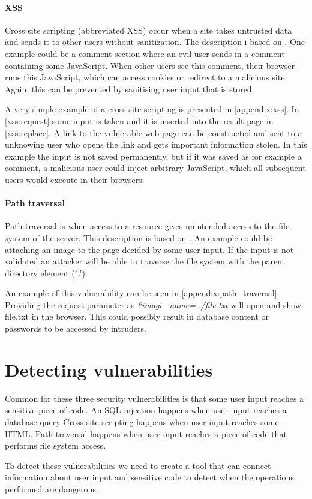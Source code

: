 \paragraph{XSS}
Cross site scripting (abbreviated XSS) occur when a site takes untrusted data and sends it to other users without sanitization.
The description i based on \citet{crosssitescripting}.
One example could be a comment section where an evil user sends in a comment containing some JavaScript.
When other users see this comment, their browser runs this JavaScript, which can access cookies or redirect to a malicious site.
Again, this can be prevented by sanitising user input that is stored.

A very simple example of a cross site scripting is presented in \cref{appendix:xss}.
In \cref{xss:request} some input is taken and it is inserted into the result page in \cref{xss:replace}.
A link to the vulnerable web page can be constructed and sent to a unknowing user who opens the link and gets important information stolen.
In this example the input is not saved permanently, but if it was saved as for example a comment, a malicious user could inject arbitrary JavaScript, which all subsequent users would execute in their browsers.

\paragraph{Path traversal}
Path traversal is when access to a resource gives unintended access to the file system of the server.
This description is based on \citet{pathtraversal}.
An example could be attaching an image to the page decided by some user input.
If the input is not validated an attacker will be able to traverse the file system with the parent directory element ('..'). 

An example of this vulnerability can be seen in \cref{appendix:path_traversal}.
Providing the request parameter as \emph{?image\_name=../file.txt} will open and show file.txt in the browser.
This could possibly result in database content or passwords to be accessed by intruders.



\section{Detecting vulnerabilities}\label{vulnerabilities:detecting}
Common for these three security vulnerabilities is that some user input reaches a sensitive piece of code.
An SQL injection happens when user input reaches a database query
Cross site scripting happens when user input reaches some HTML.
Path traversal happens when user input reaches a piece of code that performs file system access.

To detect these vulnerabilities we need to create a tool that can connect information about user input and sensitive code to detect when the operations performed are dangerous.
